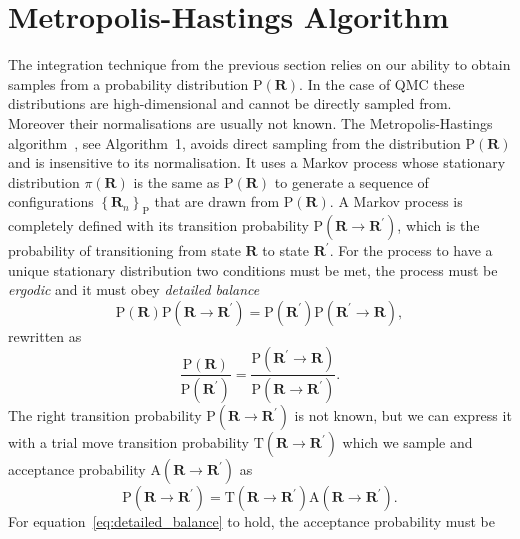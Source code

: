 \section{Metropolis-Hastings Algorithm}
\label{sec:Impl-MCMC}
The integration technique from the previous section relies on our ability to obtain samples from a probability distribution $\mathrm{P}(\mathbf{R})$. In the case of QMC these distributions are high-dimensional and cannot be directly sampled from. Moreover their normalisations are usually not known. 
The Metropolis-Hastings algorithm~\cite{hastings1970monte}, see Algorithm~1, avoids direct sampling from the distribution $\mathrm{P}(\mathbf{R})$ and is insensitive to its normalisation. It uses a Markov process whose stationary distribution $\pi(\mathbf{R})$ is the same as $\mathrm{P}(\mathbf{R})$	
to generate a sequence of configurations $\left\{\mathbf{R}_n\right\}_\mathrm{P}$ 
that are drawn from $\mathrm{P}(\mathbf{R})$. A Markov process is completely defined with its transition probability $\mathrm{P}(\mathbf{R} \rightarrow \mathbf{R}^\prime)$, which is the probability of transitioning from state $\mathbf{R}$ to state $\mathbf{R}^\prime$. For the process to have a unique stationary distribution two conditions must be met, the process must be \emph{ergodic} and it must obey \emph{detailed balance}
\begin{equation}
\mathrm{P}(\mathbf{R}) \mathrm P(\mathbf{R} \rightarrow \mathbf{R}^\prime) = \mathrm{P}(\mathbf{R}^\prime) \mathrm P(\mathbf{R}^\prime \rightarrow \mathbf{R}),
\end{equation}
rewritten as
\begin{equation}
\label{eq:detailed_balance}
\frac{\mathrm P ({\mathbf{R}})}{\mathrm P ({\mathbf{R}^\prime})} = \frac{\mathrm P(\mathbf{R}^\prime \rightarrow \mathbf{R})}{\mathrm P(\mathbf{R} \rightarrow \mathbf{R}^\prime)}.
\end{equation}
The right transition probability $\mathrm P(\mathbf{R} \rightarrow \mathbf{R}^\prime)$ is not known, but we can express it with a trial move transition probability $\mathrm{T}(\mathbf{R} \rightarrow \mathbf{R}^\prime)$ which we sample and acceptance probability $\mathrm{A}(\mathbf{R} \rightarrow \mathbf{R}^\prime)$ as
\begin{equation}
\mathrm P(\mathbf{R} \rightarrow \mathbf{R}^\prime) = \mathrm T(\mathbf{R} \rightarrow \mathbf{R}^\prime) \mathrm A(\mathbf{R} \rightarrow \mathbf{R}^\prime).
\end{equation}
For equation~\eqref{eq:detailed_balance} to hold, the acceptance probability must be 
